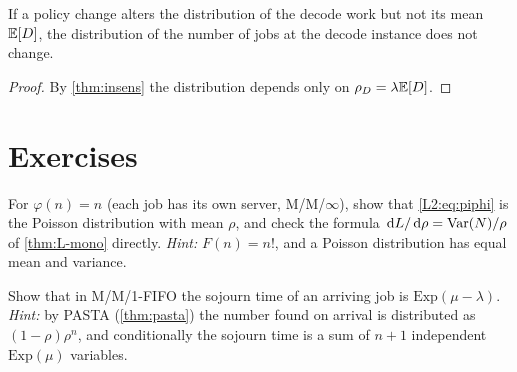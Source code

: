 \begin{corollary}\label{L2:cor:decode-hit}
If a policy change alters the distribution of the decode work but not its mean $\mathbb{E}[D]$,
the distribution of the number of jobs at the decode instance does not change.
\end{corollary}
\begin{proof}
By \cref{thm:insens} the distribution depends only on $\rho_D=\lambda\mathbb{E}[D]$.
\end{proof}


\section{Exercises}

\begin{exercise}\label{L2:ex:mminf}
For $\varphi(n)=n$ (each job has its own server, M/M/$\infty$), show that
\eqref{L2:eq:piphi} is the Poisson distribution with mean $\rho$, and check the formula
$\,\mathrm{d} L/\,\mathrm{d}\rho=\operatorname{Var}(N)/\rho$ of \cref{thm:L-mono} directly.
\emph{Hint:} $F(n)=n!$, and a Poisson distribution has equal mean and variance.
\end{exercise}

\begin{exercise}\label{L2:ex:mm1wait}
Show that in M/M/1-FIFO the sojourn time of an arriving job is $\mathrm{Exp}(\mu-\lambda)$.
\emph{Hint:} by PASTA (\cref{thm:pasta}) the number found on arrival is distributed as
$(1-\rho)\rho^n$, and conditionally the sojourn time is a sum of $n+1$ independent
$\mathrm{Exp}(\mu)$ variables.
\end{exercise}

